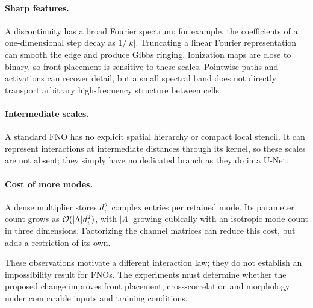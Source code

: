 \paragraph{Sharp features.} A discontinuity has a broad Fourier spectrum; for example, the coefficients of a one-dimensional step decay as $1/|k|$. Truncating a linear Fourier representation can smooth the edge and produce Gibbs ringing. Ionization maps are close to binary, so front placement is sensitive to these scales. Pointwise paths and activations can recover detail, but a small spectral band does not directly transport arbitrary high-frequency structure between cells.

\paragraph{Intermediate scales.} A standard FNO has no explicit spatial hierarchy or compact local stencil. It can represent interactions at intermediate distances through its kernel, so these scales are not absent; they simply have no dedicated branch as they do in a U-Net.

\paragraph{Cost of more modes.} A dense multiplier stores $d_v^2$ complex entries per retained mode. Its parameter count grows as $\mathcal{O}(|\Lambda|d_v^2)$, with $|\Lambda|$ growing cubically with an isotropic mode count in three dimensions. Factorizing the channel matrices can reduce this cost, but adds a restriction of its own.

These observations motivate a different interaction law; they do not establish an impossibility result for FNOs. The experiments must determine whether the proposed change improves front placement, cross-correlation and morphology under comparable inputs and training conditions.
